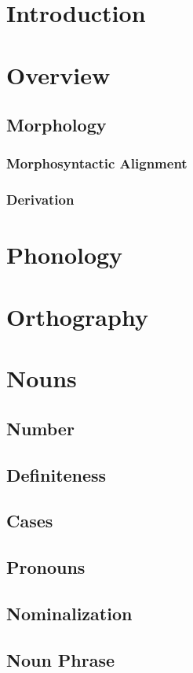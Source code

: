 \documentclass{article}
\begin{document}
\chapter{Introduction}

\chapter{Overview}
	\section{Morphology}
		\subsection{Morphosyntactic Alignment}
		\subsection{Derivation}

\chapter{Phonology}

\chapter{Orthography}

\chapter{Nouns}
	\section{Number}
	\section{Definiteness}
	\section{Cases}
	\section{Pronouns}
	\section{Nominalization}
	\section{Noun Phrase}
	
\end{document}
